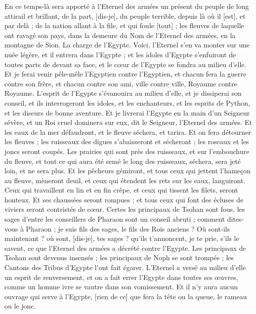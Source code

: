 \begin{multicols}{2}
En ce temps-là sera apporté à l'Eternel des armées un présent du peuple de long attirail et brillant, de la part, [dis-je], du peuple terrible, depuis là où il [est], et par delà ; de la nation allant à la file, et qui foule [tout] ; les fleuves de laquelle ont ravagé son pays, dans la demeure du Nom de l'Eternel des armées, en la montagne de Sion.
\VerseOne{}La charge de l'Egypte. Voici, l'Eternel s'en va monter sur une nuée légère, et il entrera dans l'Egypte ; et les idoles d'Egypte s'enfuiront de toutes parts de devant sa face, et le cœur de l'Egypte se fondra au milieu d'elle.
Et je ferai venir pêle-mêle l'Egyptien contre l'Egyptien, et chacun fera la guerre contre son frère, et chacun contre son ami, ville contre ville, Royaume contre Royaume.
L'esprit de l'Egypte s'évanouira au milieu d'elle, et je dissiperai son conseil, et ils interrogeront les idoles, et les enchanteurs, et les esprits de Python, et les diseurs de bonne aventure.
Et je livrerai l'Egypte en la main d'un Seigneur sévère, et un Roi cruel dominera sur eux, dit le Seigneur, l'Eternel des armées.
Et les eaux de la mer défaudront, et le fleuve séchera, et tarira.
Et on fera détourner les fleuves ; les ruisseaux des digues s'abaisseront et sécheront ; les roseaux et les joncs seront coupés.
Les prairies qui sont près des ruisseaux, et sur l'embouchure du fleuve, et tout ce qui aura été semé le long des ruisseaux, séchera, sera jeté loin, et ne sera plus.
Et les pêcheurs gémiront, et tous ceux qui jettent l'hameçon au fleuve, mèneront deuil, et ceux qui étendent les rets sur les eaux, languiront.
Ceux qui travaillent en lin et en fin crêpe, et ceux qui tissent les filets, seront honteux.
Et ses chaussées seront rompues ; et tous ceux qui font des écluses de viviers seront contristés de cœur.
Certes les principaux de Tsohan sont fous, les sages d'entre les conseillers de Pharaon sont un conseil abruti ; comment dites-vous à Pharaon ; je suis fils des sages, le fils des Rois anciens ?
Où sont-ils maintenant ? où sont, [dis-je], tes sages ? qu'ils t'annoncent, je te prie, s'ils le savent, ce que l'Eternel des armées a décrété contre l'Egypte.
Les principaux de Tsohan sont devenus insensés ; les principaux de Noph se sont trompés ; les Cantons des Tribus d'Egypte l'ont fait égarer.
L'Eternel a versé au milieu d'elle un esprit de renversement, et on a fait errer l'Egypte dans toutes ses œuvres, comme un homme ivre se vautre dans son vomissement.
Et il n'y aura aucun ouvrage qui serve à l'Egypte, [rien de ce] que fera la tête ou la queue, le rameau ou le jonc.

\end{multicols}
